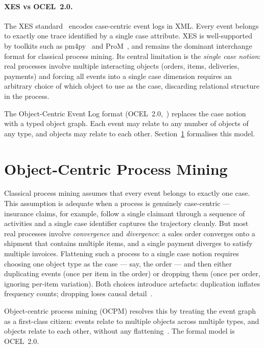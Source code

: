 \paragraph{XES vs OCEL~2.0.}
The XES standard~\cite{gunther2014xes} encodes case-centric event logs in XML.
Every event belongs to exactly one trace identified by a single case attribute.
XES is well-supported by toolkits such as pm4py~\cite{berti2019pm4py} and
ProM~\cite{verbeek2010prom}, and remains the dominant interchange format for
classical process mining. Its central limitation is the \emph{single case
notion}: real processes involve multiple interacting objects (orders, items,
deliveries, payments) and forcing all events into a single case dimension
requires an arbitrary choice of which object to use as the case, discarding
relational structure in the process.

The Object-Centric Event Log format (OCEL~2.0,~\cite{ocel20_2023}) replaces
the case notion with a typed object graph. Each event may relate to any number
of objects of any type, and objects may relate to each other.
Section~\ref{sec:bg-ocpm} formalises this model.

\section{Object-Centric Process Mining}
\label{sec:bg-ocpm}

Classical process mining assumes that every event belongs to exactly one case.
This assumption is adequate when a process is genuinely case-centric ---
insurance claims, for example, follow a single claimant through a sequence of
activities and a single case identifier captures the trajectory cleanly.
But most real processes involve \emph{convergence} and \emph{divergence}: a
sales order converges onto a shipment that contains multiple items, and a
single payment diverges to satisfy multiple invoices. Flattening such a process
to a single case notion requires choosing one object type as the case ---
say, the order --- and then either duplicating events (once per item in the
order) or dropping them (once per order, ignoring per-item variation).
Both choices introduce artefacts: duplication inflates frequency counts;
dropping loses causal detail~\cite{ghahfarokhi2021ocel}.

Object-centric process mining (OCPM) resolves this by treating the event graph
as a first-class citizen: events relate to multiple objects across multiple
types, and objects relate to each other, without any flattening~\cite{aalst2020ocpm}.
The formal model is OCEL~2.0.

